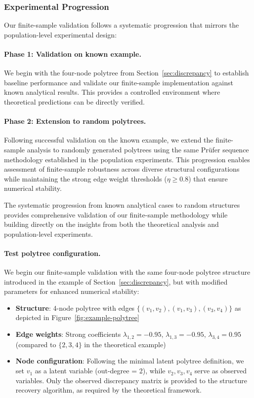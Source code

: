 \documentclass[11pt,a4paper]{article}
\numberwithin{equation}{section}
\begin{document}
\subsubsection{Experimental Progression}

Our finite-sample validation follows a systematic progression that mirrors the population-level experimental design:

\paragraph{Phase 1: Validation on known example.} We begin with the four-node polytree from Section~\ref{sec:discrepancy} to establish baseline performance and validate our finite-sample implementation against known analytical results. This provides a controlled environment where theoretical predictions can be directly verified.

\paragraph{Phase 2: Extension to random polytrees.} Following successful validation on the known example, we extend the finite-sample analysis to randomly generated polytrees using the same Prüfer sequence methodology established in the population experiments. This progression enables assessment of finite-sample robustness across diverse structural configurations while maintaining the strong edge weight thresholds ($\eta \geq 0.8$) that ensure numerical stability.

The systematic progression from known analytical cases to random structures provides comprehensive validation of our finite-sample methodology while building directly on the insights from both the theoretical analysis and population-level experiments.

\paragraph{Test polytree configuration.} We begin our finite-sample validation with the same four-node polytree structure introduced in the example of Section~\ref{sec:discrepancy}, but with modified parameters for enhanced numerical stability:
\begin{itemize}
\item \textbf{Structure}: 4-node polytree with edges $\{(v_1, v_2), (v_1, v_3), (v_3, v_4)\}$ as depicted in Figure~\ref{fig:example-polytree}
\item \textbf{Edge weights}: Strong coefficients $\lambda_{1,2} = -0.95$, $\lambda_{1,3} = -0.95$, $\lambda_{3,4} = 0.95$ (compared to $\{2, 3, 4\}$ in the theoretical example)
\item \textbf{Node configuration}: Following the minimal latent polytree definition, we set $v_1$ as a latent variable (out-degree = 2), while $v_2, v_3, v_4$ serve as observed variables. Only the observed discrepancy matrix is provided to the structure recovery algorithm, as required by the theoretical framework.
\end{itemize}
\end{document}
